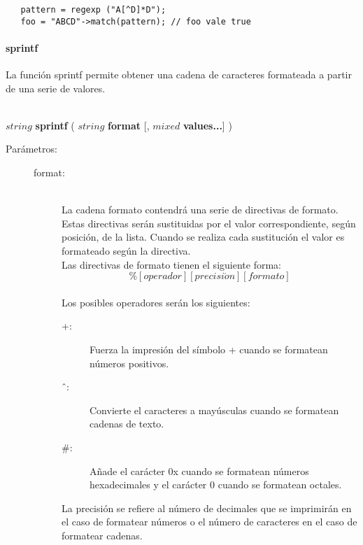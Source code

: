 \begin{lstlisting}   
   pattern = regexp ("A[^D]*D"); 
   foo = "ABCD"->match(pattern); // foo vale true
\end{lstlisting}

\paragraph{sprintf}
La función sprintf permite obtener una cadena de caracteres formateada a partir de una serie de valores. 

\begin{framed}
\hfill \\ $string$ \textbf{sprintf} ( $string$ \textbf{format} [, $mixed$ \textbf{values...}] )  
\begin{description}
\item [Parámetros:] \hfill 
   \begin{description}
   \item[format:]  \hfill \\
      La cadena formato contendrá una serie de
		directivas de formato. Estas directivas serán sustituidas por el valor correspondiente, según posición, de la
		lista. Cuando se realiza cada sustitución el valor es formateado según la directiva. \\
		
		Las directivas de formato tienen el siguiente forma:
		$$\%[operador][precisi\acute{o}n][formato]$$ \\
		Los posibles operadores serán los siguientes:
		\begin{description}
			\item[ +:] Fuerza la impresión del símbolo + cuando se formatean números positivos.
			\item[ \^\ :] Convierte el caracteres a mayúsculas cuando se formatean cadenas de texto.
			\item[ \#:] Añade el carácter 0x cuando se formatean números hexadecimales y el carácter 0 cuando se formatean octales.
		\end{description} \hfill 
	
		La precisión se refiere al número de decimales que se imprimirán en el caso de formatear
		números o el número de caracteres en el caso de formatear cadenas. \\		


\end{description}
\end{description}
\end{framed}
